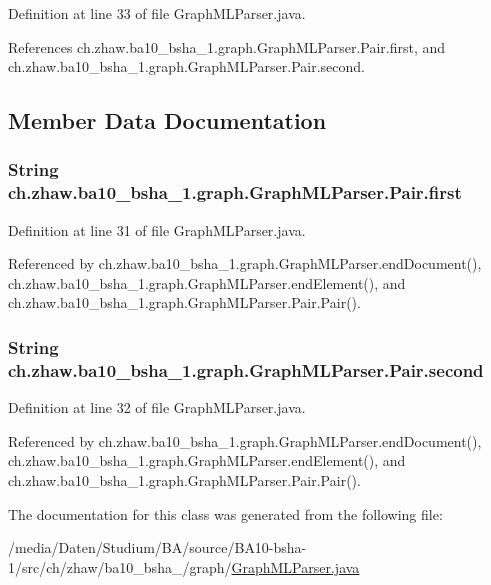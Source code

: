 Definition at line 33 of file GraphMLParser.java.

References ch.zhaw.ba10\_\-bsha\_\-1.graph.GraphMLParser.Pair.first, and ch.zhaw.ba10\_\-bsha\_\-1.graph.GraphMLParser.Pair.second.

\subsection{Member Data Documentation}
\hypertarget{classch_1_1zhaw_1_1ba10__bsha__1_1_1graph_1_1GraphMLParser_1_1Pair_ae033c9d8c8a345f5a48e5aebe8fba2ea}{
\subsubsection[{first}]{\setlength{\rightskip}{0pt plus 5cm}String {\bf ch.zhaw.ba10\_\-bsha\_\-1.graph.GraphMLParser.Pair.first}}}
\label{classch_1_1zhaw_1_1ba10__bsha__1_1_1graph_1_1GraphMLParser_1_1Pair_ae033c9d8c8a345f5a48e5aebe8fba2ea}


Definition at line 31 of file GraphMLParser.java.

Referenced by ch.zhaw.ba10\_\-bsha\_\-1.graph.GraphMLParser.endDocument(), ch.zhaw.ba10\_\-bsha\_\-1.graph.GraphMLParser.endElement(), and ch.zhaw.ba10\_\-bsha\_\-1.graph.GraphMLParser.Pair.Pair().\hypertarget{classch_1_1zhaw_1_1ba10__bsha__1_1_1graph_1_1GraphMLParser_1_1Pair_af61783aea3533f7e3821afc23dd3f00f}{
\subsubsection[{second}]{\setlength{\rightskip}{0pt plus 5cm}String {\bf ch.zhaw.ba10\_\-bsha\_\-1.graph.GraphMLParser.Pair.second}}}
\label{classch_1_1zhaw_1_1ba10__bsha__1_1_1graph_1_1GraphMLParser_1_1Pair_af61783aea3533f7e3821afc23dd3f00f}


Definition at line 32 of file GraphMLParser.java.

Referenced by ch.zhaw.ba10\_\-bsha\_\-1.graph.GraphMLParser.endDocument(), ch.zhaw.ba10\_\-bsha\_\-1.graph.GraphMLParser.endElement(), and ch.zhaw.ba10\_\-bsha\_\-1.graph.GraphMLParser.Pair.Pair().

The documentation for this class was generated from the following file:\begin{DoxyCompactItemize}
\item 
/media/Daten/Studium/BA/source/BA10-\/bsha-\/1/src/ch/zhaw/ba10\_\-bsha\_/graph/\hyperlink{GraphMLParser_8java}{GraphMLParser.java}\end{DoxyCompactItemize}
